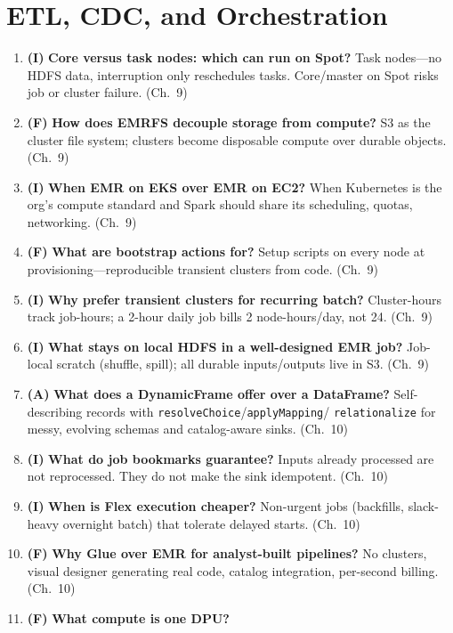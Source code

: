 \section{ETL, CDC, and Orchestration}
\begin{enumerate}
    \item \textbf{(I)} \textbf{Core versus task nodes: which can run on Spot?}
    Task nodes---no HDFS data, interruption only reschedules tasks. Core/master on Spot risks job
    or cluster failure. (Ch.~9)
    \item \textbf{(F)} \textbf{How does EMRFS decouple storage from compute?}
    S3 as the cluster file system; clusters become disposable compute over durable objects. (Ch.~9)
    \item \textbf{(I)} \textbf{When EMR on EKS over EMR on EC2?}
    When Kubernetes is the org's compute standard and Spark should share its scheduling, quotas,
    networking. (Ch.~9)
    \item \textbf{(F)} \textbf{What are bootstrap actions for?}
    Setup scripts on every node at provisioning---reproducible transient clusters from code.
    (Ch.~9)
    \item \textbf{(I)} \textbf{Why prefer transient clusters for recurring batch?}
    Cluster-hours track job-hours; a 2-hour daily job bills 2 node-hours/day, not 24. (Ch.~9)
    \item \textbf{(I)} \textbf{What stays on local HDFS in a well-designed EMR job?}
    Job-local scratch (shuffle, spill); all durable inputs/outputs live in S3. (Ch.~9)
    \item \textbf{(A)} \textbf{What does a DynamicFrame offer over a DataFrame?}
    Self-describing records with \texttt{resolveChoice}/\texttt{applyMapping}/
    \texttt{relationalize} for messy, evolving schemas and catalog-aware sinks. (Ch.~10)
    \item \textbf{(I)} \textbf{What do job bookmarks guarantee?}
    Inputs already processed are not reprocessed. They do not make the sink idempotent. (Ch.~10)
    \item \textbf{(I)} \textbf{When is Flex execution cheaper?}
    Non-urgent jobs (backfills, slack-heavy overnight batch) that tolerate delayed starts. (Ch.~10)
    \item \textbf{(F)} \textbf{Why Glue over EMR for analyst-built pipelines?}
    No clusters, visual designer generating real code, catalog integration, per-second billing.
    (Ch.~10)
    \item \textbf{(F)} \textbf{What compute is one DPU?}

\end{enumerate}
